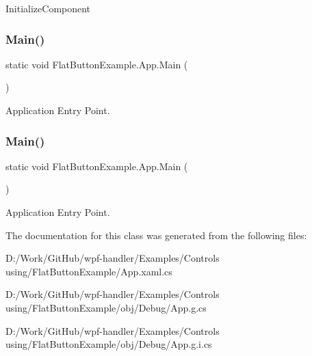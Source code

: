 Initialize\+Component 

\mbox{\label{class_flat_button_example_1_1_app_aebce76ca561aa7685a84c90ce202747f}} 
\subsubsection{\texorpdfstring{Main()}{Main()}\hspace{0.1cm}{\footnotesize\ttfamily [1/2]}}
{\footnotesize\ttfamily static void Flat\+Button\+Example.\+App.\+Main (\begin{DoxyParamCaption}{ }\end{DoxyParamCaption})\hspace{0.3cm}{\ttfamily [static]}}



Application Entry Point. 

\mbox{\label{class_flat_button_example_1_1_app_aebce76ca561aa7685a84c90ce202747f}} 
\subsubsection{\texorpdfstring{Main()}{Main()}\hspace{0.1cm}{\footnotesize\ttfamily [2/2]}}
{\footnotesize\ttfamily static void Flat\+Button\+Example.\+App.\+Main (\begin{DoxyParamCaption}{ }\end{DoxyParamCaption})\hspace{0.3cm}{\ttfamily [static]}}



Application Entry Point. 



The documentation for this class was generated from the following files\+:\begin{DoxyCompactItemize}
\item 
D\+:/\+Work/\+Git\+Hub/wpf-\/handler/\+Examples/\+Controls using/\+Flat\+Button\+Example/App.\+xaml.\+cs\item 
D\+:/\+Work/\+Git\+Hub/wpf-\/handler/\+Examples/\+Controls using/\+Flat\+Button\+Example/obj/\+Debug/App.\+g.\+cs\item 
D\+:/\+Work/\+Git\+Hub/wpf-\/handler/\+Examples/\+Controls using/\+Flat\+Button\+Example/obj/\+Debug/App.\+g.\+i.\+cs\end{DoxyCompactItemize}
